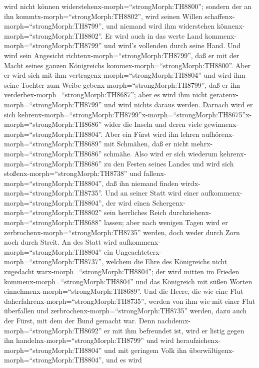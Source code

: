 wird nicht können widerstehenx-morph=``strongMorph:TH8800'';
 sondern der an ihn kommtx-morph=``strongMorph:TH8802'',
wird seinen Willen schaffenx-morph=``strongMorph:TH8799'', und niemand
wird ihm widerstehen könnenx-morph=``strongMorph:TH8802''. Er wird auch
in das werte Land kommenx-morph=``strongMorph:TH8799'' und wird's
vollenden durch seine Hand.  Und wird sein Angesicht
richtenx-morph=``strongMorph:TH8799'', daß er mit der Macht seines
ganzen Königreichs kommex-morph=``strongMorph:TH8800''. Aber er wird
sich mit ihm vertragenx-morph=``strongMorph:TH8804'' und wird ihm seine
Tochter zum Weibe gebenx-morph=``strongMorph:TH8799'', daß er ihn
verderbex-morph=``strongMorph:TH8687''; aber es wird ihm nicht
geratenx-morph=``strongMorph:TH8799'' und wird nichts daraus werden.
 Darnach wird er sich
kehrenx-morph=``strongMorph:TH8799''\textbar x-morph=``strongMorph:TH8675''x-morph=``strongMorph:TH8686''
wider die Inseln und deren viele gewinnenx-morph=``strongMorph:TH8804''.
Aber ein Fürst wird ihn lehren aufhörenx-morph=``strongMorph:TH8689''
mit Schmähen, daß er nicht mehrx-morph=``strongMorph:TH8686'' schmähe.
 Also wird er sich wiederum
kehrenx-morph=``strongMorph:TH8686'' zu den Festen seines Landes und
wird sich stoßenx-morph=``strongMorph:TH8738'' und
fallenx-morph=``strongMorph:TH8804'', daß ihn niemand finden
wirdx-morph=``strongMorph:TH8735''.  Und an seiner Statt
wird einer aufkommenx-morph=``strongMorph:TH8804'', der wird einen
Schergenx-morph=``strongMorph:TH8802'' sein herrliches Reich
durchziehenx-morph=``strongMorph:TH8688'' lassen; aber nach wenigen
Tagen wird er zerbrochenx-morph=``strongMorph:TH8735'' werden, doch
weder durch Zorn noch durch Streit.  An des Statt wird
aufkommenx-morph=``strongMorph:TH8804'' ein
Ungeachteterx-morph=``strongMorph:TH8737'', welchem die Ehre des
Königreichs nicht zugedacht warx-morph=``strongMorph:TH8804''; der wird
mitten im Frieden kommenx-morph=``strongMorph:TH8804'' und das
Königreich mit süßen Worten einnehmenx-morph=``strongMorph:TH8689''.
 Und die Heere, die wie eine Flut
daherfahrenx-morph=``strongMorph:TH8735'', werden von ihm wie mit einer
Flut überfallen und zerbrochenx-morph=``strongMorph:TH8735'' werden,
dazu auch der Fürst, mit dem der Bund gemacht war.  Denn
nachdemx-morph=``strongMorph:TH8692'' er mit ihm befreundet ist, wird er
listig gegen ihn handelnx-morph=``strongMorph:TH8799'' und wird
heraufziehenx-morph=``strongMorph:TH8804'' und mit geringem Volk ihn
überwältigenx-morph=``strongMorph:TH8804'',  und es wird
